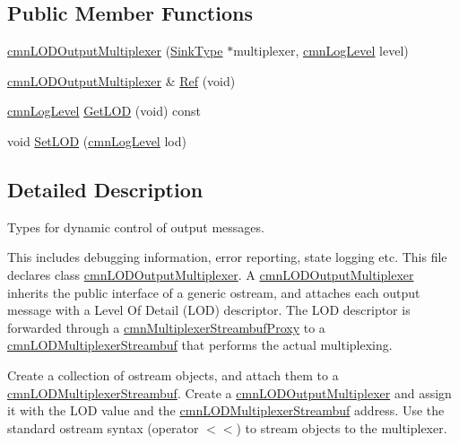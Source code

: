 \subsection*{Public Member Functions}
\begin{DoxyCompactItemize}
\item 
\hyperlink{classcmn_l_o_d_output_multiplexer_a17b986fa816c80a63425114faceb5dee}{cmn\+L\+O\+D\+Output\+Multiplexer} (\hyperlink{classcmn_l_o_d_output_multiplexer_a8020e1fe3db5ba7fb371c4554b986d6c}{Sink\+Type} $\ast$multiplexer, \hyperlink{cmn_log_lo_d_8h_a70c67165c37a0971e0dd1a85d4edaaae}{cmn\+Log\+Level} level)
\item 
\hyperlink{classcmn_l_o_d_output_multiplexer}{cmn\+L\+O\+D\+Output\+Multiplexer} \& \hyperlink{classcmn_l_o_d_output_multiplexer_a4a0452cd477f67f2dc29660ea55aca7e}{Ref} (void)
\item 
\hyperlink{cmn_log_lo_d_8h_a70c67165c37a0971e0dd1a85d4edaaae}{cmn\+Log\+Level} \hyperlink{classcmn_l_o_d_output_multiplexer_ad4735fb2cf10f4ffc5df153269e3b6d2}{Get\+L\+O\+D} (void) const 
\item 
void \hyperlink{classcmn_l_o_d_output_multiplexer_a4eef514980032c40545b4d40cc4a294b}{Set\+L\+O\+D} (\hyperlink{cmn_log_lo_d_8h_a70c67165c37a0971e0dd1a85d4edaaae}{cmn\+Log\+Level} lod)
\end{DoxyCompactItemize}


\subsection{Detailed Description}
Types for dynamic control of output messages. 

This includes debugging information, error reporting, state logging etc. This file declares class \hyperlink{classcmn_l_o_d_output_multiplexer}{cmn\+L\+O\+D\+Output\+Multiplexer}. A \hyperlink{classcmn_l_o_d_output_multiplexer}{cmn\+L\+O\+D\+Output\+Multiplexer} inherits the public interface of a generic ostream, and attaches each output message with a Level Of Detail (L\+O\+D) descriptor. The L\+O\+D descriptor is forwarded through a \hyperlink{classcmn_multiplexer_streambuf_proxy}{cmn\+Multiplexer\+Streambuf\+Proxy} to a \hyperlink{classcmn_l_o_d_multiplexer_streambuf}{cmn\+L\+O\+D\+Multiplexer\+Streambuf} that performs the actual multiplexing.

Create a collection of ostream objects, and attach them to a \hyperlink{classcmn_l_o_d_multiplexer_streambuf}{cmn\+L\+O\+D\+Multiplexer\+Streambuf}. Create a \hyperlink{classcmn_l_o_d_output_multiplexer}{cmn\+L\+O\+D\+Output\+Multiplexer} and assign it with the L\+O\+D value and the \hyperlink{classcmn_l_o_d_multiplexer_streambuf}{cmn\+L\+O\+D\+Multiplexer\+Streambuf} address. Use the standard ostream syntax (operator $<$$<$) to stream objects to the multiplexer.

